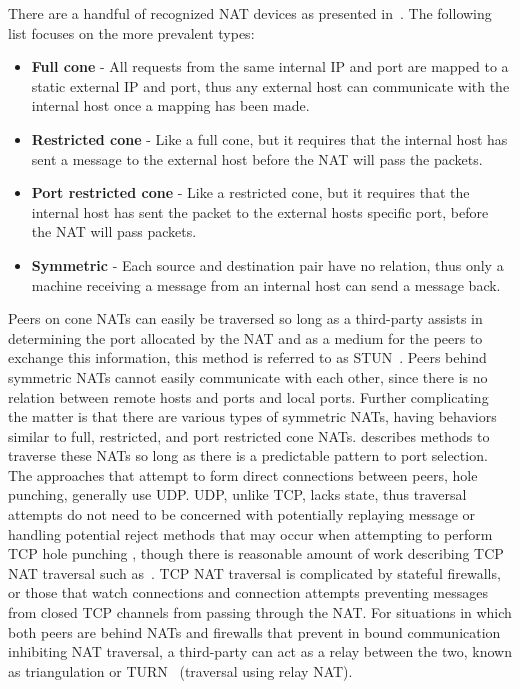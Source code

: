 \documentclass[conference]{IEEEtran}
\begin{document}
There are a handful of recognized NAT devices as presented in~\cite{stun,
p2p_nats_rfc}.  The following list focuses on the more prevalent types:
\begin{itemize}
\item \textbf{Full cone} - All requests from the same internal IP and port are
mapped to a static external IP and port, thus any external host can communicate
with the internal host once a mapping has been made.
\item \textbf{Restricted cone} - Like a full cone, but it requires that the
internal host has sent a message to the external host before the NAT will pass
the packets.
\item \textbf{Port restricted cone} - Like a restricted cone, but it requires
that the internal host has sent the packet to the external hosts specific port,
before the NAT will pass packets.
\item \textbf{Symmetric} - Each source and destination pair have no relation,
thus only a machine receiving a message from an internal host can send a
message back.
\end{itemize}

Peers on cone NATs can easily be traversed so long as a third-party assists in
determining the port allocated by the NAT and as a medium for the peers to
exchange this information, this method is referred to as STUN~\cite{stun_rfc}.
Peers behind symmetric NATs cannot easily communicate with each other, since
there is no relation between remote hosts and ports and local ports.  Further
complicating the matter is that there are various types of symmetric NATs,
having behaviors similar to full, restricted, and port restricted cone NATs.
\cite{ice} describes methods to traverse these NATs so long as there is a
predictable pattern to port selection.  The approaches that attempt to form
direct connections between peers, hole punching, generally use UDP.  UDP,
unlike TCP, lacks state, thus traversal attempts do not need to be concerned
with potentially replaying message or handling potential reject methods that
may occur when attempting to perform TCP hole punching ,  though there is
reasonable amount of work describing TCP NAT traversal such as~\cite{tcp_nat}.
TCP NAT traversal is complicated by stateful firewalls, or those that watch
connections and connection attempts preventing messages from closed TCP
channels from passing through the NAT.  For situations in which both peers are
behind NATs and firewalls that prevent in bound communication inhibiting NAT
traversal, a third-party can act as a relay between the two, known as
triangulation or TURN~\cite{turn} (traversal using relay NAT).
\end{document}
